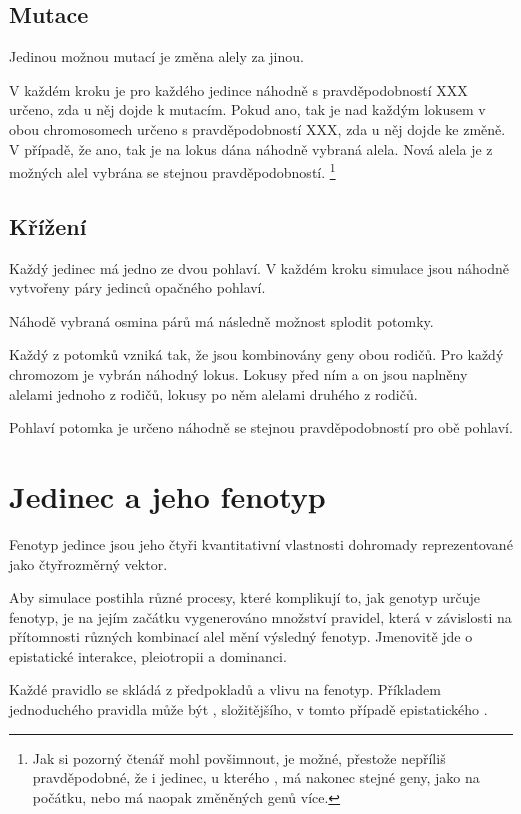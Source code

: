 \subsection{Mutace}

Jedinou možnou mutací je změna alely za jinou.

V každém kroku je pro každého jedince náhodně s pravděpodobností XXX určeno, zda u něj dojde k mutacím. Pokud ano, tak je nad každým lokusem v obou chromosomech určeno s pravděpodobností XXX, zda u něj dojde ke změně. V případě, že ano, tak je na lokus dána náhodně vybraná alela. Nová alela je z možných alel vybrána se stejnou pravděpodobností.  \footnote{Jak si pozorný čtenář mohl povšimnout, je možné, přestože nepříliš pravděpodobné, že i jedinec, u kterého , má nakonec stejné geny, jako na počátku, nebo má naopak změněných genů více.}
\subsection{Křížení}

Každý jedinec má jedno ze dvou pohlaví. V každém kroku simulace jsou náhodně vytvořeny páry jedinců opačného pohlaví.

Náhodě vybraná osmina párů má následně možnost splodit potomky.

Každý z potomků vzniká tak, že jsou kombinovány geny obou rodičů. Pro každý chromozom je vybrán náhodný lokus.
Lokusy před ním a on jsou naplněny alelami jednoho z rodičů, lokusy po něm alelami druhého z rodičů.

Pohlaví potomka je určeno náhodně se stejnou pravděpodobností pro obě pohlaví.


\section{Jedinec a jeho fenotyp}

Fenotyp jedince jsou jeho čtyři kvantitativní vlastnosti dohromady reprezentované jako čtyřrozměrný vektor.

Aby simulace postihla různé procesy, které komplikují to, jak genotyp určuje fenotyp, je na jejím začátku
vygenerováno množství pravidel, která v závislosti na přítomnosti různých kombinací alel mění výsledný fenotyp.
Jmenovitě jde o epistatické interakce, pleiotropii a dominanci.

Každé pravidlo se skládá z předpokladů a vlivu na fenotyp. Příkladem jednoduchého pravidla může být
, složitějšího, v tomto případě epistatického
 .

